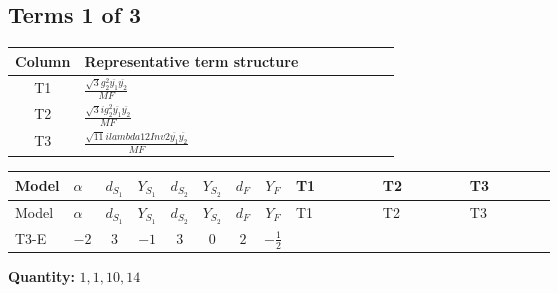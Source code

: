 \documentclass[8pt]{article}
\begin{document}
\begin{landscape}
\subsection*{Terms 1 of 3}
\begin{center}
\begin{tabular}{@{}c >{\raggedright\arraybackslash}p{0.82\linewidth}@{}}
\toprule
Column & Representative term structure \\
\midrule
T1 & \(\displaystyle \frac{\sqrt{3} g_{2}^{2} \overline{y_{1}} \overline{y_{2}}}{MF}\) \\
\midrule
T2 & \(\displaystyle \frac{\sqrt{3} i g_{2}^{2} \overline{y_{1}} \overline{y_{2}}}{MF}\) \\
\midrule
T3 & \(\displaystyle \frac{\sqrt{11} i lambda12Inv2 \overline{y_{1}} \overline{y_{2}}}{MF}\) \\
\midrule
\bottomrule
\end{tabular}
\end{center}
\smallskip
\tiny
\begin{longtable}{@{}llcccccc >{\raggedright\arraybackslash}p{0.21\linewidth} >{\raggedright\arraybackslash}p{0.21\linewidth} >{\raggedright\arraybackslash}p{0.21\linewidth}@{}}
\toprule
Model & $\alpha$ & $d_{S_1}$ & $Y_{S_1}$ & $d_{S_2}$ & $Y_{S_2}$ & $d_F$ & $Y_F$ & T1 & T2 & T3 \\
\midrule
\endfirsthead
\toprule
Model & $\alpha$ & $d_{S_1}$ & $Y_{S_1}$ & $d_{S_2}$ & $Y_{S_2}$ & $d_F$ & $Y_F$ & T1 & T2 & T3 \\
\midrule
\endhead
T3-E & $-2$ & $3$ & $-1$ & $3$ & $0$ & $2$ & $-\frac{1}{2}$ & \scriptsize\adjustbox{max width=\linewidth}{$\begin{gathered} - \frac{\sqrt{3} g_{2}^{2} \overline{y_{1}} \overline{y_{2}}}{6 MF}\end{gathered}$} & \scriptsize\adjustbox{max width=\linewidth}{$\begin{gathered} - \frac{49 \sqrt{3} i g_{2}^{2} \overline{y_{1}} \overline{y_{2}}}{24 MF}\end{gathered}$} & \scriptsize\adjustbox{max width=\linewidth}{$\begin{gathered} - \frac{3 \sqrt{11} i lambda12Inv2 \overline{y_{1}} \overline{y_{2}}}{22 MF}\end{gathered}$} \\
\midrule
\bottomrule
\end{longtable}
\clearpage
\noindent\textbf{Quantity: }$\mathrm{1,1,10,14}$\par\smallskip

\end{landscape}
\end{document}
